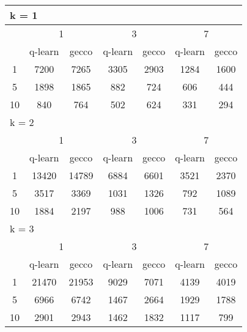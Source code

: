 \begin{table}
\begin{tabular}{|*7{c|}}
\hline
\multicolumn{7}{|l|}{k = 1} \\
\hline
\multirow{2}{*}{\diagbox{$\mu$}{$\lambda$}} & \multicolumn{2}{c|}{1} & \multicolumn{2}{c|}{3} & \multicolumn{2}{c|}{7} \\
\cline{2-7}
 & q-learn & gecco & q-learn & gecco & q-learn & gecco \\
\hline
1 & 7200 & 7265 & 3305 & 2903 & 1284 & 1600 \\
\hline
5 & 1898 & 1865 & 882 & 724 & 606 & 444 \\
\hline
10 & 840 & 764 & 502 & 624 & 331 & 294 \\
\hline
\multicolumn{7}{|l|}{k = 2} \\
\hline
\multirow{2}{*}{\diagbox{$\mu$}{$\lambda$}} & \multicolumn{2}{c|}{1} & \multicolumn{2}{c|}{3} & \multicolumn{2}{c|}{7} \\
\cline{2-7}
 & q-learn & gecco & q-learn & gecco & q-learn & gecco \\
\hline
1 & 13420 & 14789 & 6884 & 6601 & 3521 & 2370 \\
\hline
5 & 3517 & 3369 & 1031 & 1326 & 792 & 1089 \\
\hline
10 & 1884 & 2197 & 988 & 1006 & 731 & 564 \\
\hline
\multicolumn{7}{|l|}{k = 3} \\
\hline
\multirow{2}{*}{\diagbox{$\mu$}{$\lambda$}} & \multicolumn{2}{c|}{1} & \multicolumn{2}{c|}{3} & \multicolumn{2}{c|}{7} \\
\cline{2-7}
 & q-learn & gecco & q-learn & gecco & q-learn & gecco \\
\hline
1 & 21470 & 21953 & 9029 & 7071 & 4139 & 4019 \\
\hline
5 & 6966 & 6742 & 1467 & 2664 & 1929 & 1788 \\
\hline
10 & 2901 & 2943 & 1462 & 1832 & 1117 & 799 \\
\hline
\end{tabular}
\end{table}

